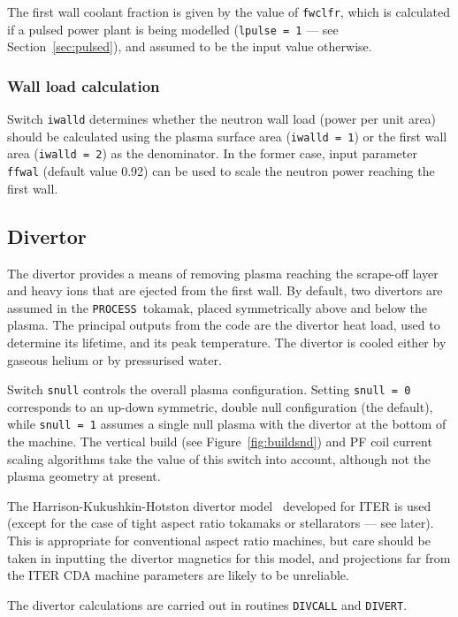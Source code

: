 \documentclass[11pt,a4paper]{report}
\newcommand{\process}{\mbox{\texttt{PROCESS}}}
\begin{document}
The first wall coolant fraction is given by the value of \texttt{fwclfr},
which is calculated if a pulsed power plant is being modelled (\texttt{lpulse
  = 1} --- see Section~\ref{sec:pulsed}), and assumed to be the input value
otherwise.

\subsubsection*{Wall load calculation}

Switch \texttt{iwalld} determines whether the neutron wall load (power per
unit area) should be calculated using the plasma surface area (\texttt{iwalld
  = 1}) or the first wall area (\texttt{iwalld = 2}) as the denominator. In
the former case, input parameter \texttt{ffwal} (default value 0.92)
can be used to scale the neutron power reaching the first wall.

\subsection{Divertor}
\label{sec:divertor}

The divertor provides a means of removing plasma reaching the scrape-off layer
and heavy ions that are ejected from the first wall.  By default, two
divertors are assumed in the \process\ tokamak, placed symmetrically above
and below the plasma. The principal outputs from the code are the divertor
heat load, used to determine its lifetime, and its peak temperature. The
divertor is cooled either by gaseous helium or by pressurised water.

Switch \texttt{snull} controls the overall plasma configuration. Setting
\texttt{snull = 0} corresponds to an up-down symmetric, double null
configuration (the default), while \texttt{snull = 1} assumes a single null
plasma with the divertor at the bottom of the machine. The vertical build (see
Figure~\ref{fig:buildsnd}) and PF coil current scaling algorithms take the
value of this switch into account, although not the plasma geometry at
present.

The Harrison-Kukushkin-Hotston divertor model~\cite{IPDG} developed for ITER
is used (except for the case of tight aspect ratio tokamaks or stellarators
--- see later). This is appropriate for conventional aspect ratio machines,
but care should be taken in inputting the divertor magnetics for this model,
and projections far from the ITER CDA machine parameters are likely to be
unreliable.

The divertor calculations are carried out in routines \texttt{DIVCALL} and
\texttt{DIVERT}.
\end{document}
